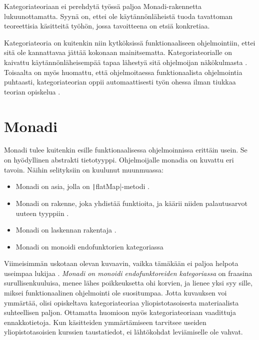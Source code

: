 Kategoriateoriaan ei perehdytä työssä paljoa Monadi-rakennetta lukuunottamatta. Syynä on, ettei ole käytännönläheistä tuoda tavattoman teoreettisia käsitteitä työhön, jossa tavoitteena on etsiä konkretiaa.

Kategoriateoria on kuitenkin niin kytköksissä funktionaaliseen ohjelmointiin, ettei sitä ole kannattavaa jättää kokonaan mainitsematta. Kategoriateorialle on kaivattu käytännönläheisempää tapaa lähestyä sitä ohjelmoijan näkökulmasta \cite{holvikari2021category}. Toisaalta on myös huomattu, että ohjelmoitaessa funktionaalista ohjelmointia puhtaasti, kategoriateorian oppii automaattisesti työn ohessa ilman tiukkaa teorian opiskelua \cite{holvikari2021category}.

\section{Monadi}

Monadi tulee kuitenkin esille funktionaalisessa ohjelmoinnissa erittäin usein. Se on hyödyllinen abstrakti tietotyyppi. Ohjelmoijalle monadia on kuvattu eri tavoin. Näihin selityksiin on kuulunut muunmuassa:

\begin{itemize}
    \item Monadi on asia, jolla on \texttt|flatMap|-metodi \cite{stackoverflow_flatmap_monad}.
    \item Monadi on rakenne, joka yhdistää funktioita, ja käärii niiden palautusarvot uuteen tyyppiin \cite{monad_wikipedia}.
    \item Monadi on laskennan rakentaja \cite{stackoverflow_what_monad}.
    \item Monadi on monoidi endofunktorien kategoriassa \cite{bartosz_category_for_progamers_10,monad_wikipedia,stackoverflow_what_monad}
\end{itemize}


Viimeisimmän uskotaan olevan kuvaavin, vaikka tämäkään ei paljoa helpota useimpaa lukijaa \cite{stackoverflow_what_monad}. \textit{Monadi on monoidi endofunktoreiden kategoriassa} on fraasina surullisenkuuluisa, menee lähes poikkeuksetta ohi korvien, ja lienee yksi syy sille, miksei funktionaalinen ohjelmointi ole suositumpaa. Jotta kuvauksen voi ymmärtää, olisi opiskeltava kategoriateoriaa yliopistotasoisesta materiaalista suhteellisen paljon. Ottamatta huomioon myös kategoriateoriaan vaadittuja ennakkotietoja.
Kun käsitteiden ymmärtämiseen tarvitsee useiden yliopistotasoisien kurssien taustatiedot, ei lähtökohdat leviämiselle ole vahvat.

